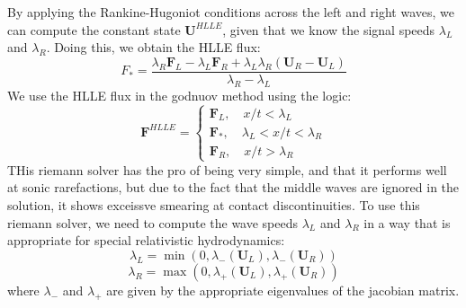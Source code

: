 By applying the Rankine-Hugoniot conditions across the left and right waves, we can compute the constant state $\bm{U}^{HLLE}$, given that we know the signal speeds $\lambda_L$ and $\lambda_R$. Doing this, we obtain the HLLE flux:
$$F_{*}=\frac{\lambda_R\bm{F}_L-\lambda_L\bm{F}_R+\lambda_L\lambda_R(\bm{U}_R-\bm{U}_L)}{\lambda_R-\lambda_L}$$
We use the HLLE flux in the godnuov method using the logic:
$$\bm{F}^{HLLE}=\begin{cases}
		\bm{F}_L,\quad x/t < \lambda_L \\
		\bm{F}_{*},\quad \lambda_L < x/t < \lambda_R \\
		\bm{F}_R,\quad x/t > \lambda_R
\end{cases}$$
THis riemann solver has the pro of being very simple, and that it performs well at sonic rarefactions, but due to the fact that the middle waves are ignored in the solution, it shows exceissve smearing at contact  discontinuities. To use this riemann solver, we need to compute the wave speeds $\lambda_L$ and $\lambda_R$ in a way that is appropriate for special relativistic hydrodynamics:
$$\lambda_L = \min(0,\lambda_{-}(\bm{U}_L),\lambda_{-}(\bm{U}_R))$$
$$\lambda_R = \max(0, \lambda_{+}(\bm{U}_L),\lambda_{+}(\bm{U}_R))$$
where $\lambda_{-}$ and $\lambda_{+}$ are given by the appropriate eigenvalues of the jacobian matrix.

